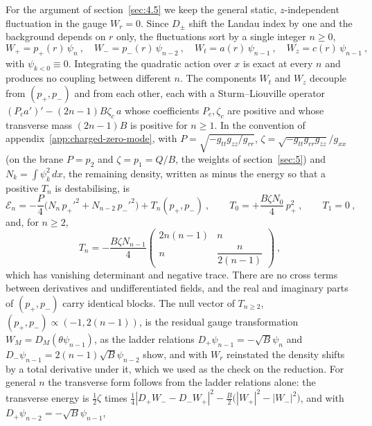 For the argument of section~\ref{sec:4.5} we keep the
general static, $z$-independent fluctuation in the gauge $W_r = 0$. Since
$D_\pm$ shift the Landau index by one and the background depends on $r$
only, the fluctuations sort by a single integer $n \ge 0$,
\begin{equation}
W_+ = p_+(r)\,\psi_n~, \quad W_- = p_-(r)\,\psi_{n-2}~, \quad W_t = a(r)\,\psi_{n-1}~, \quad W_z = c(r)\,\psi_{n-1}~,
\end{equation}
with $\psi_{k<0} \equiv 0$. Integrating the quadratic action over $x$ is
exact at every $n$ and produces no coupling between different $n$. The
components $W_t$ and $W_z$ decouple from $(p_+, p_-)$ and from each other, each
with a Sturm--Liouville operator $(P_c a')' - (2n-1)B\zeta_c\,a$ whose
coefficients $P_c, \zeta_c$ are positive and whose transverse mass
$(2n-1)B$ is positive for $n \ge 1$. In the convention of appendix~\ref{app:charged-zero-mode}, with
$P = \sqrt{-g_{tt}g_{zz}/g_{rr}}$, $\zeta = \sqrt{-g_{tt}g_{rr}g_{zz}}/g_{xx}$
(on the brane $P = p_2$ and $\zeta = p_1 = Q/B$, the weights of
section~\ref{sec:5}) and $N_k = \int\psi_k^2\,dx$, the remaining density, written as minus the
energy so that a positive $T_n$ is destabilising, is
\begin{equation}
\mathcal{E}_n = -\frac{P}{4}\big(N_n\,p_+'^2 + N_{n-2}\,p_-'^2\big) + T_n(p_+, p_-)~, \qquad
T_0 = +\frac{B\zeta N_0}{4}\,p_+^2~, \qquad T_1 = 0~,
\end{equation}
and, for $n \ge 2$,
\begin{equation}
\label{eq:Tn}
T_{n} = -\frac{B\zeta N_{n-1}}{4}\begin{pmatrix} 2n(n-1) & n \\ n & \dfrac{n}{2(n-1)} \end{pmatrix}~,
\end{equation}
which has vanishing determinant and negative trace. There are no cross
terms between derivatives and undifferentiated fields, and the real and
imaginary parts of $(p_+, p_-)$ carry identical blocks. The null vector of
$T_{n\ge2}$, $(p_+, p_-) \propto (-1, 2(n-1))$, is the residual gauge
transformation $W_M = D_M(\theta\psi_{n-1})$, as the ladder relations
$D_+\psi_{n-1} = -\sqrt B\psi_n$ and $D_-\psi_{n-1} = 2(n-1)\sqrt B\psi_{n-2}$
show, and with $W_r$ reinstated the density shifts by a total derivative
under it, which we used as the check on the reduction. For general $n$ the transverse form follows from the ladder relations
alone: the transverse energy is $\tfrac12\zeta$ times
$\tfrac14|D_+W_- - D_-W_+|^2 - \tfrac B2\big(|W_+|^2 - |W_-|^2\big)$, and with $D_+\psi_{n-2} = -\sqrt B\psi_{n-1}$,
